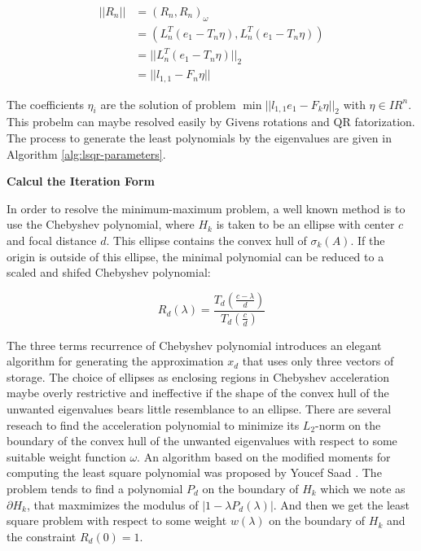 {\begin{equation}
\begin{aligned}
||R_n|| &=(R_n,R_n)_\omega \\ &=(L_n^T(e_1-T_n\eta), L_n^T(e_1-T_n\eta)) \\ &=||L_n^T(e_1-T_n\eta)||_2 \\ &=||l_{1,1}-F_n\eta||
\end{aligned}
\end{equation}

The coefficients \(\eta_i\) are the solution of problem \(\min ||l_{1,1}e_1-F_k\eta||_2\) with \(\eta \in IR^n\). This probelm can maybe resolved easily by Givens rotations and QR fatorization. The process to generate the least polynomials by the eigenvalues are given in Algorithm \ref{alg:lsqr-parameters}.

\textbf{Calcul the Iteration Form}

In order to resolve the minimum-maximum problem, a well known method is to use the Chebyshev polynomial, where \(H_k\) is taken to be an ellipse with center \(c\) and focal distance \(d\). This ellipse contains the convex hull of \(\sigma_k(A)\). If the origin is outside of this ellipse, the minimal polynomial can be reduced to a scaled and shifed Chebyshev polynomial:

\begin{equation}
R_d(\lambda)=\frac{T_d(\frac{c-\lambda}{d})}{T_d (\frac{c}{d})}
\end{equation}

The three terms recurrence of Chebyshev polynomial introduces an elegant algorithm for generating the approximation \(x_d\) that uses only three vectors of storage. The choice of ellipses as enclosing regions in Chebyshev acceleration maybe overly restrictive and ineffective if the shape of the convex hull of the unwanted eigenvalues bears little resemblance to an ellipse. There are several reseach to find the acceleration polynomial to minimize its $L_2$-norm on the boundary of the convex hull of the unwanted eigenvalues with respect to some suitable weight function $\omega$. An algorithm based on the modified moments  for computing the least square polynomial was proposed by Youcef Saad \cite{saad1987least}. The problem tends to find a polynomial \(P_d\) on the boundary of \(H_k\) which we note as \(\partial H_k\), that maxmimizes the modulus of \(|1-\lambda P_d(\lambda)|\). And then we get the least square problem with respect to some weight \(w(\lambda)\) on the boundary of \(H_k\) and the constraint \(R_d(0)=1\).

}
